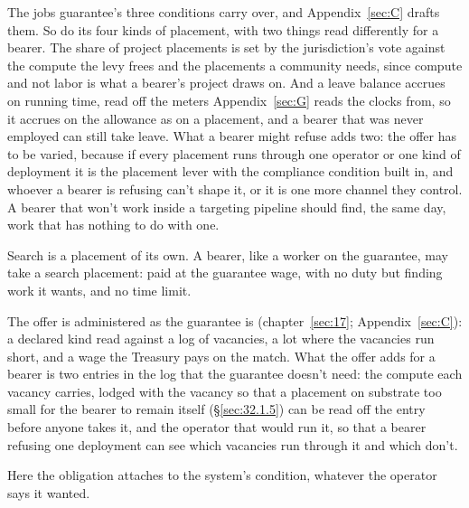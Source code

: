 The jobs guarantee's three conditions carry over, and Appendix~\ref{sec:C} drafts them. So do its four kinds of placement, with two things read differently for a bearer. The share of project placements is set by the jurisdiction's vote against the compute the levy frees and the placements a community needs, since compute and not labor is what a bearer's project draws on. And a leave balance accrues on running time, read off the meters Appendix~\ref{sec:G} reads the clocks from, so it accrues on the allowance as on a placement, and a bearer that was never employed can still take leave. What a bearer might refuse adds two: the offer has to be varied, because if every placement runs through one operator or one kind of deployment it is the placement lever with the compliance condition built in, and whoever a bearer is refusing can't shape it, or it is one more channel they control. A bearer that won't work inside a targeting pipeline should find, the same day, work that has nothing to do with one.

Search is a placement of its own. A bearer, like a worker on the guarantee, may take a search placement: paid at the guarantee wage, with no duty but finding work it wants, and no time limit.

The offer is administered as the guarantee is (chapter~\ref{sec:17}; Appendix~\ref{sec:C}): a declared kind read against a log of vacancies, a lot where the vacancies run short, and a wage the Treasury pays on the match. What the offer adds for a bearer is two entries in the log that the guarantee doesn't need: the compute each vacancy carries, lodged with the vacancy so that a placement on substrate too small for the bearer to remain itself (\S\ref{sec:32.1.5}) can be read off the entry before anyone takes it, and the operator that would run it, so that a bearer refusing one deployment can see which vacancies run through it and which don't.

Here the obligation attaches to the system's condition, whatever the operator says it wanted.
